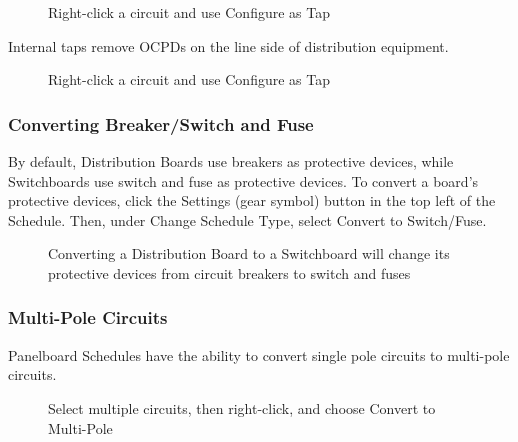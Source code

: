 \documentclass[letterpaper,10pt,english]{sphinxmanual}
\begin{document}
\begin{figure}[H]
\centering
\capstart

\noindent{}
\caption{Right-click a circuit and use Configure as Tap}\label{\detokenize{docs/userguide/buildingelectricalmodel/schedules/index-schedules:id20}}\end{figure}

Internal taps remove OCPDs on the line side of distribution equipment.

\begin{figure}[H]
\centering
\capstart

\noindent{}
\caption{Right-click a circuit and use Configure as Tap}\label{\detokenize{docs/userguide/buildingelectricalmodel/schedules/index-schedules:id21}}\end{figure}


\subsubsection{Converting Breaker/Switch and Fuse}
\label{\detokenize{docs/userguide/buildingelectricalmodel/schedules/index-schedules:converting-breaker-switch-and-fuse}}
By default, Distribution Boards use breakers as protective devices, while Switchboards use switch and fuse as protective devices.  To convert a board’s protective devices, click the Settings (gear symbol) button in the top left of the Schedule.  Then, under Change Schedule Type, select Convert to Switch/Fuse.

\begin{figure}[H]
\centering
\capstart

\noindent{}
\caption{Converting a Distribution Board to a Switchboard will change its protective devices from circuit breakers to switch and fuses}\label{\detokenize{docs/userguide/buildingelectricalmodel/schedules/index-schedules:id22}}\end{figure}


\subsubsection{Multi-Pole Circuits}
\label{\detokenize{docs/userguide/buildingelectricalmodel/schedules/index-schedules:multi-pole-circuits}}
Panelboard Schedules have the ability to convert single pole circuits to multi-pole circuits.

\begin{figure}[H]
\centering
\capstart

\noindent{}
\caption{Select multiple circuits, then right-click, and choose Convert to Multi-Pole}\label{\detokenize{docs/userguide/buildingelectricalmodel/schedules/index-schedules:id23}}\end{figure}
\end{document}

